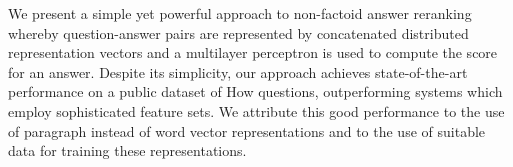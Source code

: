 We present a simple yet powerful approach to non-factoid answer reranking whereby question-answer pairs are represented by concatenated distributed representation vectors and a multilayer perceptron is used to compute the score for an answer. Despite its simplicity, our approach achieves state-of-the-art performance on a public dataset of How questions, outperforming systems which employ sophisticated feature sets. We attribute this good performance to the use of paragraph instead of word vector representations and to the use of suitable data for training these representations.
